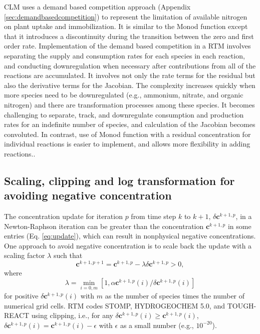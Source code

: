 \documentclass[gmd, manuscript]{copernicus}
\begin{document}
CLM uses a demand based competition approach (Appendix \ref{sec:demandbasedcompetition}) to represent the limitation of available nitrogen on plant uptake and immobilization. It is similar to the Monod function except that it introduces a discontinuity during the transition between the zero and first order rate. Implementation of the demand based competition in a RTM involves separating the supply and consumption rates for each species in each reaction, and conducting downregulation when necessary after contributions from all of the reactions are accumulated. It involves not only the rate terms for the residual but also the derivative terms for the Jacobian. The complexity increases quickly when more species need to be downregulated (e.g., ammonium,
nitrate, and organic nitrogen) and there are transformation processes among these species. It becomes challenging to separate, track, and downregulate consumption and production rates for an indefinite number of species, and calculation of the Jacobian becomes convoluted. In contrast, use of Monod function with a residual concentration for individual reactions is easier to implement, and allows more flexibility in adding reactions..

\subsection{Scaling, clipping and log transformation for avoiding negative concentration}
The concentration update for iteration $p$ from time step $k$ to $k+1$, $\delta \mathbf{c}^{k+1,p}$, in a Newton-Raphson iteration can be greater than the concentration $\mathbf{c}^{k+1,p}$ in some entries (Eq. \ref{eq:update}), which can result in nonphysical negative concentrations. One approach to avoid negative concentration is to scale back the update with a scaling factor
$\lambda$ \citep{Bethke2007,Hammond2003} such that 
\begin{equation}
\mathbf{c}^{k+1,p+1}=\mathbf{c}^{k+1,p}-\lambda \delta \mathbf{c}^{k+1,p} > 0,
\label{eq:lambda}
\end{equation}
where
\begin{equation}
\lambda = \min_{i=0,m}\left[1, \alpha {\mathbf{c}^{k+1,p}(i)}/{\delta \mathbf{c}^{k+1,p} (i)}\right]
\label{eq:alpha}
\end{equation}
for positive $\delta \mathbf{c}^{k+1,p} (i)$ with $m$ as the
number of species times the number of numerical grid cells. 
RTM codes STOMP, HYDROGEOCHEM 5.0, and TOUGH-REACT using clipping, i.e., for any $\delta \mathbf{c}^{k+1,p}(i) \geq \mathbf{c}^{k+1,p}(i)$, $\delta \mathbf{c}^{k+1,p}(i) = \mathbf{c}^{k+1,p}(i) - \epsilon$  with $\epsilon$ as a small number (e.g., $10^{-20}$). 
\end{document}

